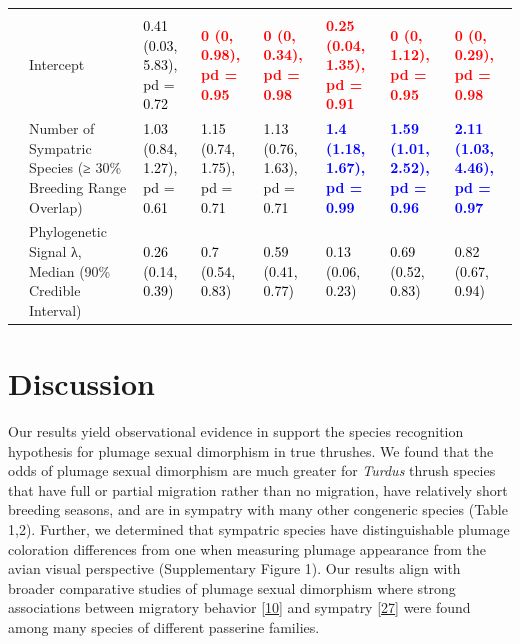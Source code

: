 \documentclass[
  a4paper,
]{article}
\begin{document}
\begin{landscape}
\begin{table}
{\begin{tabular}[t]{llllllll}
\addlinespace[0.3em]
\multicolumn{1}{l}{\textbf{Breeding Sympatry}}\\
\hspace{1em} & Intercept & \textcolor{black}{0.41 (0.03, 5.83), pd = 0.72} & \textcolor{red}{\textbf{0 (0, 0.98), pd = 0.95}} & \textcolor{red}{\textbf{0 (0, 0.34), pd = 0.98}} & \textcolor{red}{\textbf{0.25 (0.04, 1.35), pd = 0.91}} & \textcolor{red}{\textbf{0 (0, 1.12), pd = 0.95}} & \textcolor{red}{\textbf{0 (0, 0.29), pd = 0.98}}\\
 & Number of Sympatric Species 
\hspace{1em} (≥ 30\% Breeding Range Overlap) & \textcolor{black}{1.03 (0.84, 1.27), pd = 0.61} & \textcolor{black}{1.15 (0.74, 1.75), pd = 0.71} & \textcolor{black}{1.13 (0.76, 1.63), pd = 0.71} & \textcolor{blue}{\textbf{1.4 (1.18, 1.67), pd = 0.99}} & \textcolor{blue}{\textbf{1.59 (1.01, 2.52), pd = 0.96}} & \textcolor{blue}{\textbf{2.11 (1.03, 4.46), pd = 0.97}}\\
\hspace{1em} & Phylogenetic Signal λ, Median (90\% Credible Interval) & \textcolor{black}{0.26 (0.14, 0.39)} & \textcolor{black}{0.7 (0.54, 0.83)} & \textcolor{black}{0.59 (0.41, 0.77)} & \textcolor{black}{0.13 (0.06, 0.23)} & \textcolor{black}{0.69 (0.52, 0.83)} & \textcolor{black}{0.82 (0.67, 0.94)}\\
\bottomrule
\end{tabular}}
\end{table}
\end{landscape}

\hypertarget{discussion}{%
\section{Discussion}\label{discussion}}

Our results yield observational evidence in support the species
recognition hypothesis for plumage sexual dimorphism in true thrushes.
We found that the odds of plumage sexual dimorphism are much greater for
\emph{Turdus} thrush species that have full or partial migration rather
than no migration, have relatively short breeding seasons, and are in
sympatry with many other congeneric species (Table 1,2). Further, we
determined that sympatric species have distinguishable plumage
coloration differences from one when measuring plumage appearance from
the avian visual perspective (Supplementary Figure 1). Our results align
with broader comparative studies of plumage sexual dimorphism where
strong associations between migratory behavior
{[}\protect\hyperlink{ref-dale2015}{10}{]} and sympatry
{[}\protect\hyperlink{ref-cooney2017}{27}{]} were found among many
species of different passerine families.
\end{document}
